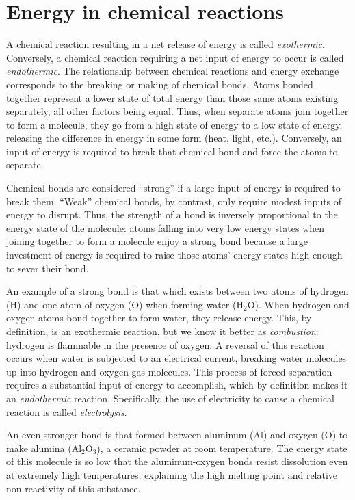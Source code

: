 \filbreak
\section{Energy in chemical reactions}

A chemical reaction resulting in a net release of energy is called \textit{exothermic}.  Conversely, a chemical reaction requiring a net input of energy to occur is called \textit{endothermic}.  The relationship between chemical reactions and energy exchange corresponds to the breaking or making of chemical bonds.  Atoms bonded together represent a lower state of total energy than those same atoms existing separately, all other factors being equal.  Thus, when separate atoms join together to form a molecule, they go from a high state of energy to a low state of energy, releasing the difference in energy in some form (heat, light, etc.).  Conversely, an input of energy is required to break that chemical bond and force the atoms to separate.     

Chemical bonds are considered ``strong'' if a large input of energy is required to break them.  ``Weak'' chemical bonds, by contrast, only require modest inputs of energy to disrupt.  Thus, the strength of a bond is inversely proportional to the energy state of the molecule: atoms falling into very low energy states when joining together to form a molecule enjoy a strong bond because a large investment of energy is required to raise those atoms' energy states high enough to sever their bond.

An example of a strong bond is that which exists between two atoms of hydrogen (H) and one atom of oxygen (O) when forming water (H$_{2}$O).  When hydrogen and oxygen atoms bond together to form water, they release energy.  This, by definition, is an exothermic reaction, but we know it better as \textit{combustion}: hydrogen is flammable in the presence of oxygen.  A reversal of this reaction occurs when water is subjected to an electrical current, breaking water molecules up into hydrogen and oxygen gas molecules.  This process of forced separation requires a substantial input of energy to accomplish, which by definition makes it an \textit{endothermic} reaction.  Specifically, the use of electricity to cause a chemical reaction is called \textit{electrolysis}.    

An even stronger bond is that formed between aluminum (Al) and oxygen (O) to make alumina (Al$_{2}$O$_{3}$), a ceramic powder at room temperature.  The energy state of this molecule is so low that the aluminum-oxygen bonds resist dissolution even at extremely high temperatures, explaining the high melting point and relative non-reactivity of this substance.











